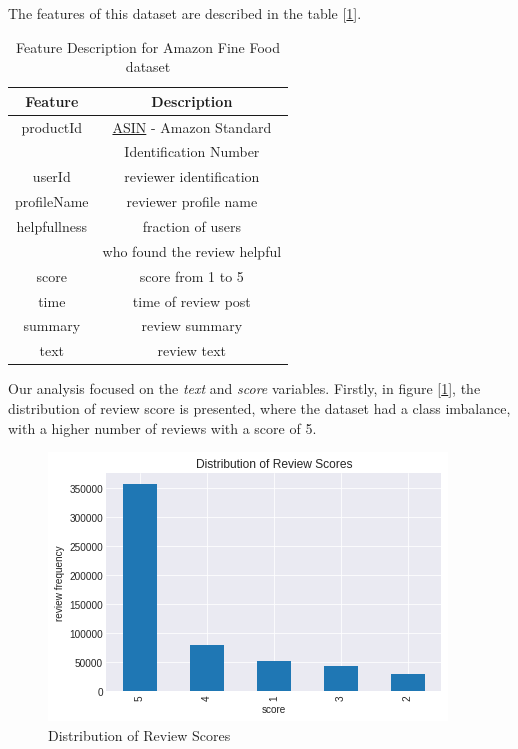 \documentclass[11pt]{article}
\begin{document}
 The features of this dataset are described in the table [\ref{feat-description}].
 \begin{table}
    \centering
     \begin{tabular}{c c}
     \hline
          \textbf{Feature} & \textbf{Description}\\ \hline 
     productId &\href{https://en.wikipedia.org/wiki/Amazon_Standard_Identification_Number}{ASIN} - Amazon Standard \\
     & Identification Number\\ \hline
          userId & reviewer identification \\
          profileName & reviewer profile name\\
          helpfullness & fraction of users\\
          & who found the review helpful\\
          score & score from 1 to 5\\
          time &time of review post\\
          summary&review summary \\ 
          text & review text\\   \hline
     \end{tabular}
     \caption{Feature Description for Amazon Fine Food dataset}
     \label{feat-description}
 \end{table}
 Our analysis focused on the \textit{text} and \textit{score} variables. Firstly, in figure [\ref{fig:review_score_distri}], the distribution of review score is presented, where the dataset had a class imbalance, with a higher number of reviews with a score of 5. 
\begin{figure}
     \centering
     \includegraphics[scale=0.5]{figures/distribution_review_score.png}
     \caption{Distribution of Review Scores}
     \label{fig:review_score_distri}
 \end{figure}
\end{document}
